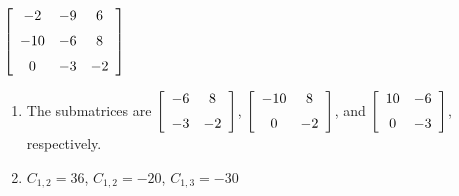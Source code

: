 {$\left[ \begin {array}{ccc} -2&-9&6\\\noalign{\medskip}-10&-6&8
\\\noalign{\medskip}0&-3&-2\end {array} \right]$} 
{\begin{enumerate}
\item The submatrices are $\left[ \begin {array}{cc} -6&8\\\noalign{\medskip}-3&-2\end {array}
 \right] $, $ \left[ \begin {array}{cc} -10&8\\\noalign{\medskip}0&-2\end {array} \right]$, and 
 $\left[ \begin {array}{cc} 10&-6\\\noalign{\medskip}0&-3\end {array}
 \right]$, respectively.
 \item	$C_{1,2}=36$, $C_{1,2}=-20$, $C_{1,3}=-30$
 \end{enumerate}
}

  

 

